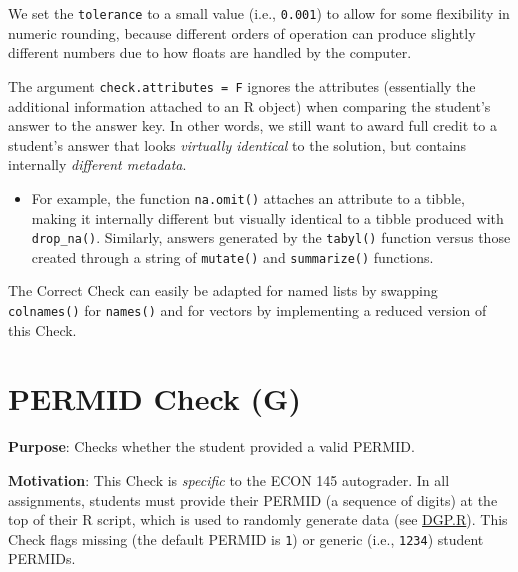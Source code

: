 \documentclass[
  12pt,
]{book}
\providecommand{\tightlist}{%
  \setlength{\itemsep}{0pt}\setlength{\parskip}{0pt}}
\begin{document}
We set the \texttt{tolerance} to a small value (i.e., \texttt{0.001}) to allow for some flexibility in numeric rounding, because different orders of operation can produce slightly different numbers due to how floats are handled by the computer.

The argument \texttt{check.attributes\ =\ F} ignores the attributes (essentially the additional information attached to an R object) when comparing the student's answer to the answer key. In other words, we still want to award full credit to a student's answer that looks \emph{virtually identical} to the solution, but contains internally \emph{different metadata}.

\begin{itemize}
\tightlist
\item
  For example, the function \texttt{na.omit()} attaches an attribute to a tibble, making it internally different but visually identical to a tibble produced with \texttt{drop\_na()}. Similarly, answers generated by the \texttt{tabyl()} function versus those created through a string of \texttt{mutate()} and \texttt{summarize()} functions.
\end{itemize}

The Correct Check can easily be adapted for named lists by swapping \texttt{colnames()} for \texttt{names()} and for vectors by implementing a reduced version of this Check.

\section{PERMID Check (G)}\label{PERMID-Check}

\textbf{Purpose}: Checks whether the student provided a valid PERMID.

\textbf{Motivation}: This Check is \emph{specific} to the ECON 145 autograder. In all assignments, students must provide their PERMID (a sequence of digits) at the top of their R script, which is used to randomly generate data (see \hyperref[DGP.R]{DGP.R}). This Check flags missing (the default PERMID is \texttt{1}) or generic (i.e., \texttt{1234}) student PERMIDs.
\end{document}
